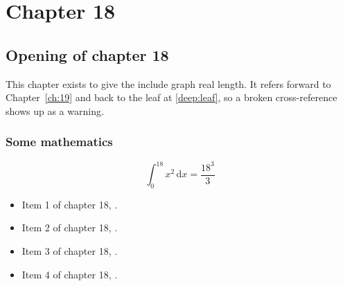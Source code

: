 \chapter{Chapter 18}
\label{ch:18}
\section{Opening of chapter 18}
This chapter exists to give the include graph real length. It refers
forward to Chapter~\ref{ch:19} and back to the leaf
at \ref{deep:leaf}, so a broken cross-reference shows up as a warning.

\subsection{Some mathematics}
\begin{equation}
  \int_0^{18} x^{2} \, \mathrm{d}x = \frac{18^{3}}{3}
\end{equation}

\begin{itemize}
  \item Item 1 of chapter 18, .
  \item Item 2 of chapter 18, .
  \item Item 3 of chapter 18, .
  \item Item 4 of chapter 18, .
\end{itemize}
